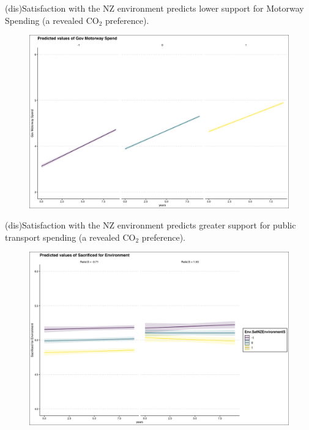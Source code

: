 \documentclass{beamer}
\begin{document}
\begin{frame}{(dis)Satisfaction with the NZ environment predicts lower support for Motorway Spending (a revealed CO$_2$ preference).}
\begin{figure}
\includegraphics[width=.8\textwidth,height=\textheight,keepaspectratio]{Figures/XY_PLOT_Env.MotorwaySpend.SATENVIRON.png}
\end{figure}
\end{frame}

\begin{frame}{(dis)Satisfaction with the NZ environment predicts greater support for public transport spending (a revealed CO$_2$ preference).}
\begin{figure}
\includegraphics[width=.8\textwidth,height=\textheight,keepaspectratio]{Figures/X_SACRIFICEMADE_Env.SatNZEnvironmentS_Relid.S}
\end{figure}
\end{frame}
\end{document}
